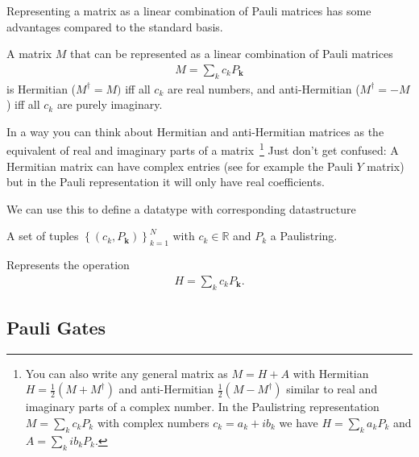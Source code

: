 Representing a matrix as a linear combination of Pauli matrices has some advantages compared to the standard basis.
\begin{theorem*}
    A matrix $M$ that can be represented as a linear combination of Pauli matrices
    \begin{align*}
        M = \sum_{k} c_k P_\mathbf{k}
    \end{align*}
    is Hermitian ($M^\dagger=M)$ iff all $c_k$ are real numbers, and anti-Hermitian ($M^\dagger = - M$) iff all $c_k$ are purely imaginary.
\end{theorem*}
In a way you can think about Hermitian and anti-Hermitian matrices as the equivalent of real and imaginary parts of a matrix~\footnote{You can also write any general matrix as $M=H + A$ with Hermitian $H=\frac{1}{2}(M+M^\dagger)$ and anti-Hermitian $\frac{1}{2}(M - M^\dagger)$ similar to real and imaginary parts of a complex number. In the Paulistring representation $M=\sum_k c_k P_k$ with complex numbers $c_k = a_k + ib_k$ we have $H=\sum_k a_k P_k$ and $A=\sum_k ib_k P_k$.} Just don't get confused: A Hermitian matrix can have complex entries (see for example the Pauli $Y$ matrix) but in the Pauli representation it will only have real coefficients.

We can use this to define a datatype with corresponding datastructure
\begin{def*}\phantom{...}

    A set of tuples $\left\{(c_k,P_\mathbf{k})\right\}_{k=1}^N$ with $c_k\in \mathbb{R} $ and $P_k$ a Paulistring.

    Represents the operation
    \begin{align*}
        H = \sum_k c_k P_\mathbf{k}.
    \end{align*}
\end{def*}

\subsection{Pauli Gates}


